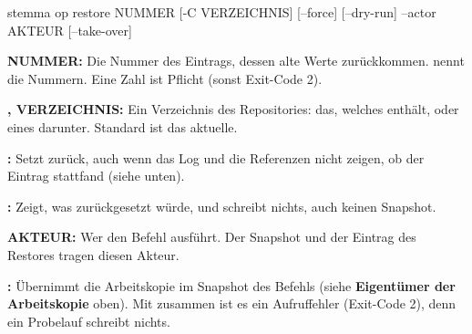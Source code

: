 \starttyping
stemma op restore NUMMER [-C VERZEICHNIS] [--force] [--dry-run] --actor AKTEUR [--take-over]
\stoptyping

\startitemize
\item {\bf NUMMER:} Die Nummer des Eintrags, dessen alte Werte zurückkommen.
 nennt die Nummern. Eine Zahl ist Pflicht (sonst Exit-Code 2).
\item {\bf {},  VERZEICHNIS:} Ein Verzeichnis des Repositories:
das, welches  enthält, oder eines darunter. Standard ist das aktuelle.
\item {\bf {}:} Setzt zurück, auch wenn das Log und die Referenzen nicht
zeigen, ob der Eintrag stattfand (siehe unten).
\item {\bf {}:} Zeigt, was zurückgesetzt würde, und schreibt nichts,
auch keinen Snapshot.
\item {\bf {} AKTEUR:} Wer den Befehl ausführt. Der Snapshot und der
Eintrag des Restores tragen diesen Akteur.
\item {\bf {}:} Übernimmt die Arbeitskopie im Snapshot des Befehls
(siehe {\bf Eigentümer der Arbeitskopie} oben).
Mit  zusammen ist es ein Aufruffehler (Exit-Code 2),
denn ein Probelauf schreibt nichts.
\stopitemize

